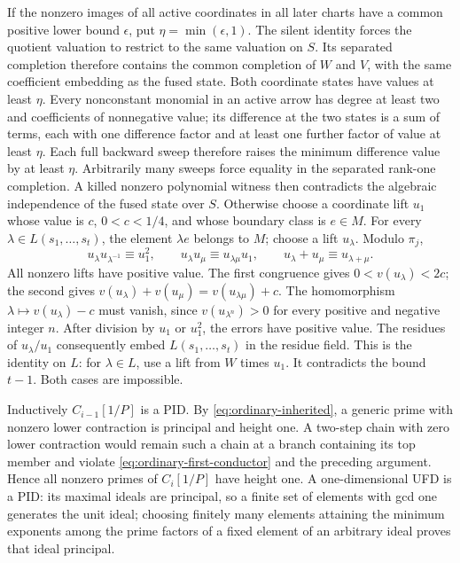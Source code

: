 \documentclass[11pt,reqno]{amsart}
\numberwithin{equation}{section}
\theoremstyle{plain}
\theoremstyle{definition}
\theoremstyle{remark}
\begin{document}
If the nonzero images of all active coordinates in all later
charts have a common positive lower bound \(\epsilon\), put
\(\eta=\min(\epsilon,1)\). The silent identity forces the quotient
valuation to restrict to the same valuation on \(S\). Its separated
completion therefore contains the common completion of \(W\)
and \(V\), with the same coefficient embedding as the fused state.
Both coordinate states have values at least \(\eta\).
Every nonconstant monomial in an active arrow has degree at least
two and coefficients of nonnegative value; its difference at the
two states is a sum of terms, each with one difference factor and
at least one further factor of value at least \(\eta\).
Each full backward sweep
therefore raises the minimum difference value by at least
\(\eta\). Arbitrarily many sweeps force equality in the separated
rank-one completion. A killed nonzero polynomial witness then
contradicts the algebraic independence of the fused state over \(S\).
Otherwise choose a coordinate lift \(u_1\) whose value is
\(c\), \(0<c<1/4\), and whose boundary class is \(e\in M\).
For every \(\lambda\in L(s_1,\ldots,s_t)\), the element
\(\lambda e\) belongs to \(M\); choose a lift \(u_\lambda\).
Modulo \(\pi_j\),
\[
 u_\lambda u_{\lambda^{-1}}\equiv u_1^2,\qquad
 u_\lambda u_\mu\equiv u_{\lambda\mu}u_1,\qquad
 u_\lambda+u_\mu\equiv u_{\lambda+\mu}.
\]
All nonzero lifts have positive value. The first congruence
gives \(0<v(u_\lambda)<2c\); the second gives
\(v(u_\lambda)+v(u_\mu)=v(u_{\lambda\mu})+c\).
The homomorphism \(\lambda\mapsto v(u_\lambda)-c\) must vanish,
since \(v(u_{\lambda^n})>0\) for every positive and negative
integer \(n\). After division by \(u_1\) or \(u_1^2\), the
errors have positive value. The residues of
\(u_\lambda/u_1\) consequently embed \(L(s_1,\ldots,s_t)\)
in the residue field. This is the identity on \(L\): for
\(\lambda\in L\), use a lift from \(W\) times \(u_1\).
It contradicts the bound \(t-1\). Both cases are impossible.

Inductively \(C_{i-1}[1/P]\) is a PID. By
\eqref{eq:ordinary-inherited}, a generic prime with nonzero
lower contraction is principal and height one. A two-step
chain with zero lower contraction would remain such a chain
at a branch containing its top member and violate
\eqref{eq:ordinary-first-conductor} and the preceding argument.
Hence all nonzero primes of \(C_i[1/P]\) have height one.
A one-dimensional UFD is a PID: its maximal ideals are
principal, so a finite set of elements with gcd one generates
the unit ideal; choosing finitely many elements attaining the
minimum exponents among the prime factors of a fixed element
of an arbitrary ideal proves that ideal principal.
\end{document}
